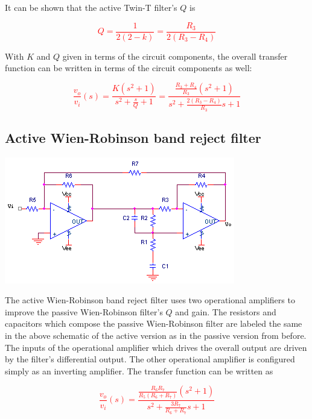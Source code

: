 It can be shown \autocite[322]{op-amps-for-everyone} that the active Twin-T filter's $Q$ is

\textcolor{red}{
\begin{equation}
Q = \frac{1}{2(2-k)} = \frac{R_{3}}{2(R_{3}-R_{4})}
\end{equation}
}

With $K$ and $Q$ given in terms of the circuit components, the overall transfer function can be written in terms of the circuit components as well:

\textcolor{red}{
\begin{equation}
\frac{v_{o}}{v_{i}}(s) = \frac{K(s^{2}+1)}{s^{2}+\frac{s}{Q}+1} =  \frac{\frac{R_{3}+R_{4}}{R_{3}}(s^{2}+1)}{s^{2}+\frac{2(R_{3}-R_{4})}{R_{3}}s+1}
\end{equation}
}

\subsection{Active Wien-Robinson band reject filter}
\begin{center}
	\includegraphics{schematics/activeWien-Robinsonbandrejectfilter.PNG}
\end{center}
The active Wien-Robinson band reject filter uses two operational amplifiers to improve the passive Wien-Robinson filter's $Q$ and gain.
The resistors and capacitors which compose the passive Wien-Robinson filter are labeled the same in the above schematic of the active version as in the passive version from before.
The inputs of the operational amplifier which drives the overall output are driven by the filter's differential output.
The other operational amplifier is configured simply as an inverting amplifier.
The transfer function \autocite[323]{op-amps-for-everyone} can be written as

\textcolor{red}{
\begin{equation}
\frac{v_{o}}{v_{i}}(s) = \frac{\frac{R_{6}R_{7}}{R_{5}(R_{6}+R_{7})}(s^{2}+1)}{s^{2}+\frac{3R_{7}}{R_{6}+R_{7}}s+1}
\label{eq:activeWienRobinsonbandreject}
\end{equation}
}

